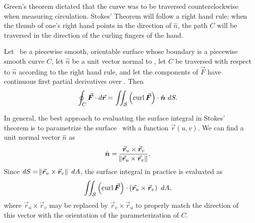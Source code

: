 Green's theorem dictated that the curve was to be traversed counterclockwise when measuring circulation. Stokes' Theorem will follow a right hand rule: when the thumb of one's right hand points in the direction of $\hat n$, the path $C$ will be traversed in the direction of the curling fingers of the hand.

\begin{theorem}
\label{thm:stokes_thm}
Let \surfaceS\ be a piecewise smooth, orientable surface whose boundary is a piecewise smooth curve $C$, let $\hat n$ be a unit vector normal to \surfaceS, let $C$ be traversed with respect to $\hat n$ according to the right hand rule, and let the components of $\vec F$ have continuous first partial derivatives over \surfaceS. Then
$$\oint_C \vec F\cdot d\vec r = \iint_\surfaceS \left(\curl \vec F \right)\cdot \hat n\ dS.$$
\end{theorem}

In general, the best approach to evaluating the surface integral in Stokes' theorem is to parametrize the surface \surfaceS\ with a function $\vec r(u,v)$. We can find a unit normal vector $\hat n$ as 
$$\hat n = \frac{\vec r_u\times\vec r_v}{\norm{\vec r_u\times\vec r_v}}.$$
Since $dS = \norm{\vec r_u\times\vec r_v}\ dA$, the surface integral in practice is evaluated as 
$$\iint_\surfaceS \left(\curl \vec F\right)\cdot \left(\vec r_u\times\vec r_v\right)\ dA,$$
where $\vec r_u\times\vec r_v$ may be replaced by $\vec r_v\times\vec r_u$ to properly match the direction of this vector with the orientation of the parameterization of $C$.


